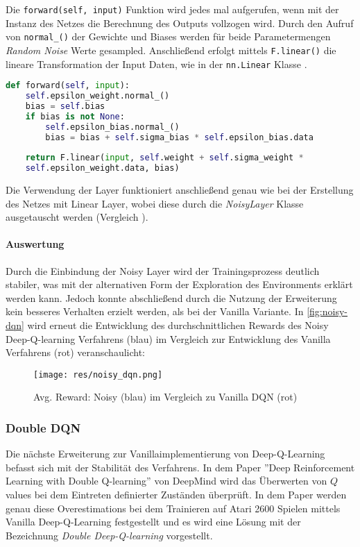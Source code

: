 \documentclass[11pt]{scrartcl}
\begin{document}
Die \lstinline!forward(self, input)! Funktion wird jedes mal aufgerufen, wenn mit der Instanz
des Netzes die Berechnung des Outputs vollzogen wird. Durch den Aufruf von 
\lstinline!normal_()! der Gewichte und Biases werden für beide Parametermengen 
\textit{Random Noise} Werte gesampled. Anschließend erfolgt mittels \lstinline!F.linear()!
die lineare Transformation der Input Daten, wie in der \lstinline!nn.Linear! Klasse 
\cite[~S.179 ff.]{L2018}.

\begin{lstlisting}[language=Python, caption=\textit{forward()} Funktion Noisy Layer, 
label=lst:noisy_forward]
	def forward(self, input):
	self.epsilon_weight.normal_()
	bias = self.bias
	if bias is not None:
	    self.epsilon_bias.normal_()
	    bias = bias + self.sigma_bias * self.epsilon_bias.data
		
	return F.linear(input, self.weight + self.sigma_weight *
	self.epsilon_weight.data, bias)
\end{lstlisting}

Die Verwendung der Layer funktioniert anschließend genau wie bei der Erstellung des Netzes mit
Linear Layer, wobei diese durch die \textit{NoisyLayer} Klasse ausgetauscht werden (Vergleich
). %

\paragraph*{Auswertung}
\noindent
\newline
Durch die Einbindung der Noisy Layer wird der Trainingsprozess deutlich stabiler, was mit der
alternativen Form der Exploration des Environments erklärt werden kann. Jedoch konnte
abschließend durch die Nutzung der Erweiterung kein besseres Verhalten erzielt werden, als
bei der Vanilla Variante. In \autoref{fig:noisy-dqn} wird erneut die Entwicklung des
durchschnittlichen Rewards des Noisy Deep-Q-learning Verfahrens (blau) im Vergleich zur
Entwicklung des Vanilla Verfahrens (rot) veranschaulicht:

\begin{figure}[htp]
\centering
\texttt{[image: res/noisy\_dqn.png]}
\caption{Avg. Reward: Noisy (blau) im Vergleich zu Vanilla DQN (rot)}
\label{fig:noisy-dqn}
\end{figure}

\subsubsection{Double DQN} %
Die nächste Erweiterung zur Vanillaimplementierung von Deep-Q-Learning befasst sich mit der
Stabilität des Verfahrens. In dem Paper ''Deep Reinforcement Learning with Double Q-learning''
von DeepMind\cite{HGD2015} wird das Überwerten von $Q$ values bei dem Eintreten definierter
Zuständen überprüft. In dem Paper werden genau diese Overestimations bei dem Trainieren auf
Atari 2600 Spielen mittels Vanilla Deep-Q-Learning festgestellt und es wird eine Lösung mit
der Bezeichnung \textit{Double Deep-Q-learning} vorgestellt.
\end{document}
